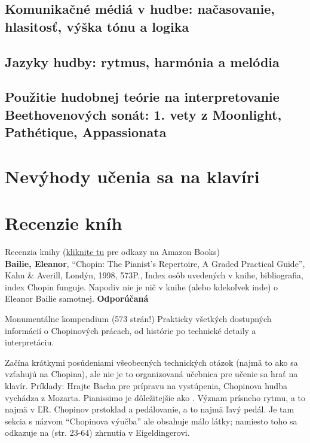 \documentclass[11pt,a4paper%
]{article}
\newcommand{\noteDynamics}[2][1.3]{\raisebox{0.05ex}{\fontspec[Scale=#1,Path=fonts/]{emmentaler-11.otf}{#2}}}
\begin{document}
\subsection{Komunikačné médiá v hudbe: načasovanie, hlasitosť, výška tónu a logika}

\subsection{Jazyky hudby: rytmus, harmónia a melódia}

\subsection{Použitie hudobnej teórie na interpretovanie Beethovenových sonát: 1. vety z Moonlight, Pathétique, Appassionata}

\section{Nevýhody učenia sa na klavíri}

\section*{Recenzie kníh}
Recenzia knihy (\href{http://www.pianopractice.org/recommendedbooks.html}{kliknite tu} pre odkazy na Amazon Books)\\
\textbf{Bailie, Eleanor}, “Chopin: The Pianist's Repertoire, A Graded Practical Guide”, Kahn \& Averill, Londýn, 1998, 573P., Index osôb uvedených v knihe, bibliografia, index Chopin funguje. Napodiv nie je nič v knihe (alebo kdekoľvek inde) o Eleanor Bailie samotnej. \textbf{Odporúčaná}

Monumentálne kompendium (573 strán!) Prakticky všetkých dostupných informácií o Chopinových prácach, od histórie po technické detaily a interpretáciu.

Začína krátkymi posúdeniami všeobecných technických otázok (najmä to ako sa vzťahujú na Chopina), ale nie je to organizovaná učebnica pre učenie sa hrať na klavír. Príklady: Hrajte Bacha pre prípravu na vystúpenia, Chopinova hudba vychádza z Mozarta. Pianissimo je dôležitejšie ako \noteDynamics{ff}. Význam prísneho rytmu, a to najmä v ĽR. Chopinov prstoklad a pedálovanie, a to najmä ľavý pedál. Je tam sekcia s názvom “Chopinova výučba” ale obsahuje málo látky; namiesto toho sa odkazuje na (str. 23-64) zhrnutia v Eigeldingerovi.
\end{document}
